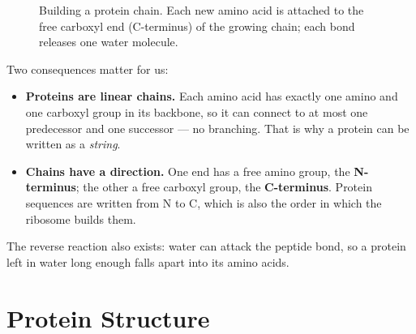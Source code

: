 \documentclass[11pt, oneside]{book}
\let\originalsection\section
\renewcommand{\section}{\Needspace{7\baselineskip}\originalsection}
\begin{document}
\begin{figure}[htbp]
\centering
{}
\caption{Building a protein chain. Each new amino acid is attached to the
free carboxyl end (C-terminus) of the growing chain; each bond releases one
water molecule.}
\label{fig:peptide}
\end{figure}

Two consequences matter for us:
\begin{itemize}
  \item \textbf{Proteins are linear chains.} Each amino acid has exactly one
    amino and one carboxyl group in its backbone, so it can connect to at most
    one predecessor and one successor --- no branching. That is why a protein
    can be written as a \emph{string}.
  \item \textbf{Chains have a direction.} One end has a free amino group, the
    \textbf{N-terminus}; the other a free carboxyl group, the
    \textbf{C-terminus}. Protein sequences are written from N to C, which is
    also the order in which the ribosome builds them.
\end{itemize}
The reverse reaction also exists: water can attack the peptide bond, so a
protein left in water long enough falls apart into its amino acids.

\section{Protein Structure}
\label{sec:protein-structure}
\end{document}
